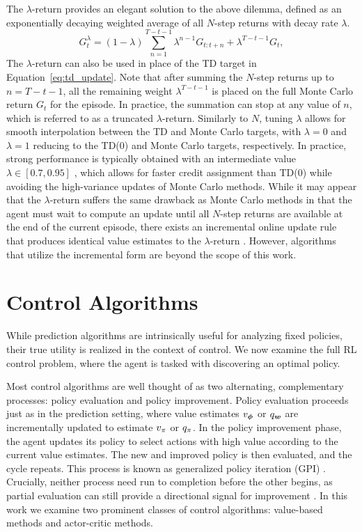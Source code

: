   The $\lambda$-return provides an elegant solution to the above dilemma, defined as an exponentially decaying weighted average of all $N$-step returns with decay rate $\lambda$.
  \begin{equation}
      G_t^\lambda = (1 - \lambda) \sum_{n=1}^{T - t - 1} \lambda^{n-1} G_{t:t+n} + \lambda^{T - t - 1} G_t,
      \label{eq:lambda_return}
  \end{equation}
  The $\lambda$-return can also be used in place of the TD target in Equation~\eqref{eq:td_update}. Note that after summing the $N$-step returns up to $n = T - t - 1$, all the remaining weight $\lambda^{T-t-1}$ is placed on the full Monte Carlo return $G_t$ for the episode. In practice, the summation can stop at any value of $n$, which is referred to as a truncated $\lambda$-return. Similarly to $N$, tuning $\lambda$ allows for smooth interpolation between the TD and Monte Carlo targets, with $\lambda = 0$ and $\lambda = 1$ reducing to the TD(0) and Monte Carlo targets, respectively. In practice, strong performance is typically obtained with an intermediate value $\lambda \in [0.7, 0.95]$ , which allows for faster credit assignment than TD(0) while avoiding the high-variance updates of Monte Carlo methods. 
  While it may appear that the $\lambda$-return suffers the same drawback as Monte Carlo methods in that the agent must wait to compute an update until all $N$-step returns are available at the end of the current episode, there exists an incremental online update rule that produces identical value estimates to the  $\lambda$-return . However, algorithms that utilize the incremental form are beyond the scope of this work. 
  
  \section{Control Algorithms}
  While prediction algorithms are intrinsically useful for analyzing fixed policies, their true utility is realized in the context of control. We now examine the full RL control problem, where the agent is tasked with discovering an optimal policy. 
  
  Most control algorithms are well thought of as two alternating, complementary processes: policy evaluation and policy improvement. Policy evaluation proceeds just as in the prediction setting, where value estimates $v_{\bm \phi}$ or $q_{\bm w}$ are incrementally updated to estimate $v_{\pi}$ or $q_{\pi}$. In the policy improvement phase, the agent updates its policy to select actions with high value according to the current value estimates. The new and improved policy is then evaluated, and the cycle repeats. This process is known as generalized policy iteration (GPI) \cite{sutton1998introduction}. Crucially, neither process need run to completion before the other begins, as partial evaluation can still provide a directional signal for improvement . In this work we examine two prominent classes of control algorithms: value-based methods and actor-critic methods. 
  
